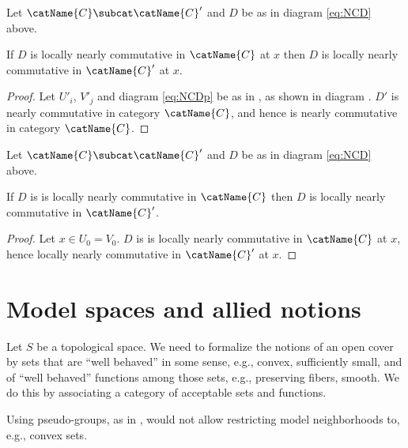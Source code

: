 \documentclass{article}
\begin{document}
\begin{corollary}
\label{cor:NCDp}
Let $\catName{C} \subcat \catName{C}'$ and $D$ be as in diagram
\eqref{eq:NCD} above.

If $D$ is locally nearly commutative in $\catName{C}$ at $x$ then $D$ is
locally nearly commutative in $\catName{C}'$ at $x$.

\begin{proof}
Let $U'_i$, $V'_j$ and diagram \eqref{eq:NCDp} be as in
\!, as shown in diagram \!.  $D'$
is nearly commutative in category $\catName{C}$, and hence is nearly
commutative in category $\catName{C}$.
\end{proof}
\end{corollary}

\begin{corollary}
\label{cor:NCDn}
Let $\catName{C} \subcat \catName{C}'$ and $D$ be as in diagram
\eqref{eq:NCD} above.

If $D$ is is locally nearly commutative in $\catName{C}$ then $D$
is locally nearly commutative in $\catName{C}'$.

\begin{proof}
Let $x \in U_0 = V_0$. $D$ is is locally nearly commutative in
$\catName{C}$ at $x$, hence locally nearly commutative in $\catName{C}'$
at $x$.
\end{proof}
\end{corollary}

\part{Model spaces and allied notions}
\label{part:modeldef}
Let $S$ be a topological space. We need to formalize the notions of an
open cover by sets that are ``well behaved'' in some sense, e.g.,
convex, sufficiently small, and of {\textquotedblleft}well
behaved{\textquotedblright} functions among those sets, e.g., preserving
fibers, smooth. We do this by associating a category of acceptable sets
and functions.

\begin{remark}
Using pseudo-groups, as in \cite[p.~1]{FoundDiffGeo1}, would not allow
restricting model neighborhoods to, e.g., convex sets.
\end{remark}
\end{document}
